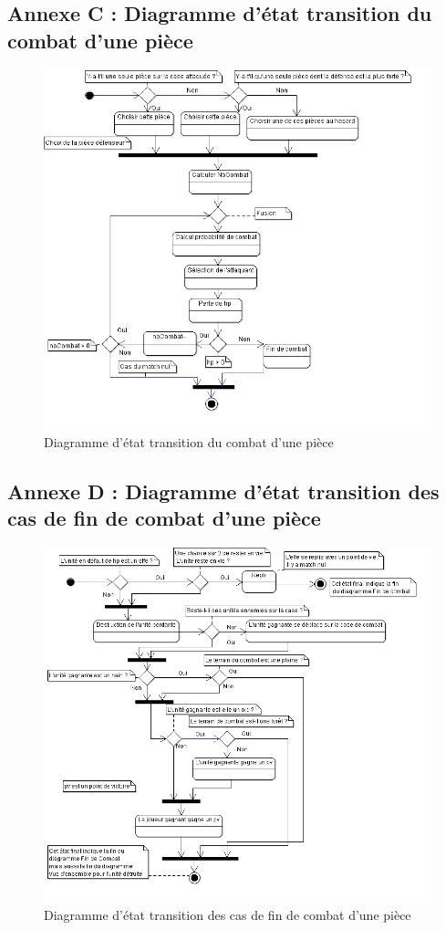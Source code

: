 \subsection{Annexe C : Diagramme d'état transition du combat d'une pièce}
\begin{figure}[!h]
\centering
\includegraphics[scale=0.75]{img/Combat.png}
\caption{Diagramme d'état transition du combat d'une pièce}
\end{figure}
\clearpage

\subsection{Annexe D : Diagramme d'état transition des cas de fin de combat d'une pièce}
\begin{figure}[!h]
\centering
\includegraphics[scale=0.69]{img/FinDeCombat.png}
\caption{Diagramme d'état transition des cas de fin de combat d'une pièce}
\end{figure}
\clearpage

